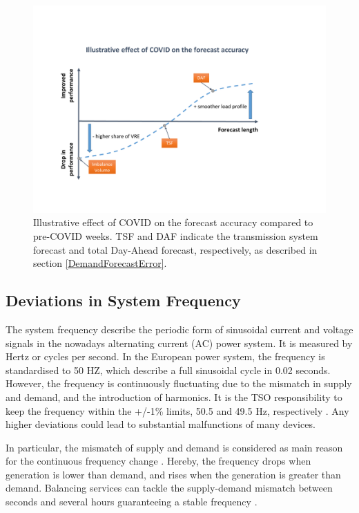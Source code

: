 \documentclass[energies,article,submit,moreauthors,pdftex]{Definitions/mdpi}
\begin{document}
\begin{figure}[H]
\centering
\hspace{-25pt}\includegraphics[trim={-1cm 3cm 3cm 3cm},clip,width=1\textwidth]{Graphics/Illustrative-forecast-summary.pdf}
\caption{Illustrative effect of COVID on the forecast accuracy compared to pre-COVID weeks. TSF and DAF indicate the transmission system forecast and total Day-Ahead forecast, respectively, as described in section \ref{DemandForecastError}.}\label{fig:Illustrative-forecast-summary}
\end{figure} 


\subsection{Deviations in  System Frequency}

The system frequency describe the periodic form of sinusoidal current and voltage signals in the nowadays alternating current (AC) power system. It is measured by Hertz or cycles per second. In the European power system, the frequency is standardised to 50 HZ, which describe a full sinusoidal cycle in 0.02 seconds. However, the frequency is continuously fluctuating due to the mismatch in supply and demand, and the introduction of harmonics. It is the TSO responsibility to keep the frequency within the +/-1\% limits, 50.5 and 49.5 Hz, respectively \cite{ELEXON2020ELEXONBMRS}. Any higher deviations could lead to substantial malfunctions of many devices.

In particular, the mismatch of supply and demand is considered as main reason for the continuous frequency change \cite{ELEXON2020ELEXONBMRS}. Hereby, the frequency drops when generation is lower than demand, and rises when the generation is greater than demand. Balancing services can tackle the supply-demand mismatch between seconds and several hours guaranteeing a stable frequency \cite{Nationalgrid2018BalancingStatement}. 
\end{document}
